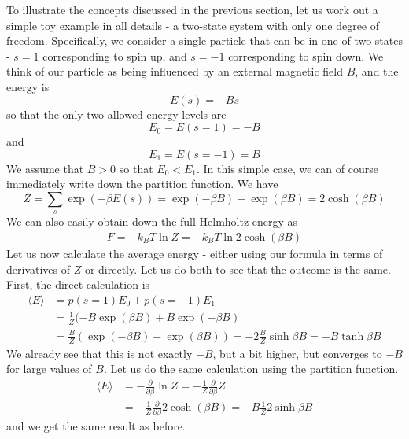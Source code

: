 \documentclass[a4paper, draft]{article}
\theoremstyle{own}
\theoremstyle{remark}
\begin{document}
To illustrate the concepts discussed in the previous section, let us work out a simple toy example in all details - a two-state system with only one degree of freedom. Specifically, we consider a single particle that can be in one of two states - $s = 1$ corresponding to spin up, and $s = -1$ corresponding to spin down. We think of our particle as being influenced by an external magnetic field $B$, and the energy is
$$
E(s) = - Bs
$$
so that the only two allowed energy levels are
$$
E_0 = E(s = 1) = - B
$$
and
$$
E_1 = E(s = -1) = B
$$
We assume that $B > 0$ so that $E_0 < E_1$. In this simple case, we can of course immediately write down the partition function. We have
$$
Z = \sum_s \exp(-\beta E(s)) = \exp(-\beta B ) + \exp(\beta B) = 2 \cosh(\beta B)
$$
We can also easily obtain down the full Helmholtz energy as
\begin{align*}
F = - k_B T \ln Z = - k_B T \ln 2 \cosh(\beta B)
\end{align*}
Let us now calculate the average energy - either using our formula in terms of derivatives of $Z$ or directly. Let us do both to see that the outcome is the same. First, the direct calculation is
\begin{align*}
\langle E \rangle &= p(s = 1) E_0 + p(s = -1) E_1 \\
&=  \frac{1}{Z} (- B \exp(\beta B) + B \exp(-\beta B) \\
&=  \frac{B}{Z} (\exp(-\beta B) - \exp(\beta B) ) = - 2 \frac{B}{Z} \sinh \beta B = -   B \tanh \beta B
\end{align*}
We already see that this is not exactly $-B$, but a bit higher, but converges to $-B$ for large values of $B$. Let us do the same calculation using the partition function.
\begin{align*}
\langle E \rangle &= - \frac{\partial}{\partial \beta } \ln Z = - \frac{1}{Z} \frac{\partial}{\partial \beta } Z \\
&= - \frac{1}{Z} \frac{\partial}{\partial \beta } 2 \cosh(\beta B) = - B \frac{1}{Z} 2 \sinh \beta B 
\end{align*}
and we get the same result as before. 
\end{document}
